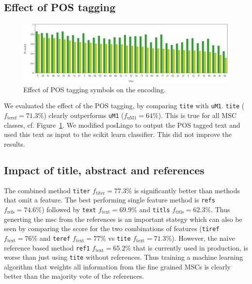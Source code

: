 \subsection{Effect of POS tagging}
\begin{figure}[hb]
  \centering
  \includegraphics[width=1.1\textwidth]{POSeffekt.png}
  \caption{Effect of POS tagging symbols on the encoding.}\label{fgPOS}
\end{figure}
We evaluated the effect of the POS tagging, by comparing \texttt{tite} with \texttt{uM1}. \texttt{tite} ($f_\mathrm{teref}=71.3\%$) clearly outperforms \texttt{uM1} ($f_\mathrm{uM1}=64\%$). This is true for all MSC classes, cf. Figure~\ref{fgPOS}. We modified posLingo to output the POS tagged text and used this text as input to the scikit learn classifier. This did not improve the results.

\subsection{Impact of title, abstract and references}
The combined method \texttt{titer} $f_\mathrm{titer}=77.3\%$ is significantly better than methods that omit a feature.
The best performing single feature method is \texttt{refs} $f_\mathrm{refs}=74.6\%$) followed by \texttt{text} $f_\mathrm{text}=69.9\%$ and \texttt{titls} $f_\mathrm{titls}=62.3\%$.
Thus generting the msc from the references is an important stategy which can also be seen by comparing the score for the two combinations of features (\texttt{tiref} $f_\mathrm{text}=76\%$ and \texttt{teref} $f_\mathrm{text}=77\%$ vs \texttt{tite} $f_\mathrm{text}=71.3\%$).
However, the naive reference based method \texttt{ref1} $f_\mathrm{text}=65.2\%$ that is currently used in production, is worse than just using \texttt{tite} without references.
Thus training a machine learning algorithm that weights all information from the fine grained MSCs is clearly better than the majority vote of the references.


